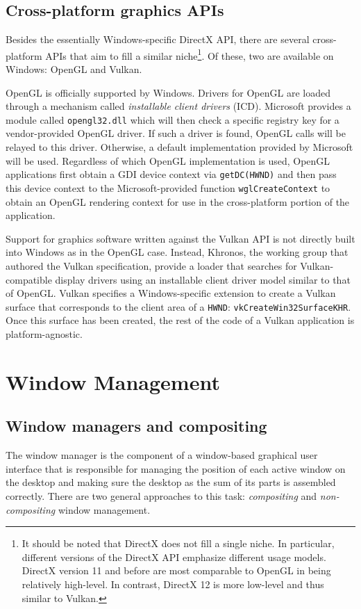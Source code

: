 \documentclass[10pt,twocolumn,a4paper]{article}
\begin{document}
		\subsection{Cross-platform graphics APIs} %
			Besides the essentially Windows-specific DirectX API, there are several
			cross-platform APIs that aim to fill a similar niche\footnote{It
			should be noted that DirectX does not fill a single niche. In particular,
			different versions of the DirectX API emphasize different usage models.
			DirectX version 11 and before are most comparable to OpenGL in being
			relatively high-level. In contrast, DirectX 12 is more low-level and
			thus similar to Vulkan.}. Of these, two are available on Windows: OpenGL
			and Vulkan.

			OpenGL is officially supported by Windows. Drivers for OpenGL are
			loaded through a mechanism called \textit{installable client
			drivers} (ICD). Microsoft provides a module called
			\texttt{opengl32.dll} which will then check a specific registry key
			for a vendor-provided OpenGL driver. If such a driver is found,
			OpenGL calls will be relayed to this driver. Otherwise, a
			default implementation provided by Microsoft will be used. Regardless
			of which OpenGL implementation is used, OpenGL applications first obtain
			a GDI device context via \texttt{getDC(HWND)} and then pass this device
			context to the Microsoft-provided function \texttt{wglCreateContext}
			to obtain an OpenGL rendering context for use in the cross-platform portion
			of the application.

			Support for graphics software written against the Vulkan API is not
			directly built into Windows as in the OpenGL case. Instead, Khronos,
			the working group that authored the Vulkan specification, provide
			a loader that searches for Vulkan-compatible display drivers using
			an installable client driver model similar to that of OpenGL. Vulkan
			specifies a Windows-specific extension to create a Vulkan surface that
			corresponds to the client area of a \texttt{HWND}:
			\texttt{vkCreateWin32SurfaceKHR}. Once this surface
			has been created, the rest of the code of a Vulkan application is
			platform-agnostic. %

	\section{Window Management}
		\subsection{Window managers and compositing}
			The window manager is the component of a window-based graphical user
			interface that is responsible for managing the position of each active
			window on the desktop and making sure the desktop as the sum of its
			parts is assembled correctly. There are two general approaches to this
			task: \emph{compositing} and \emph{non-compositing} window management.
\end{document}
